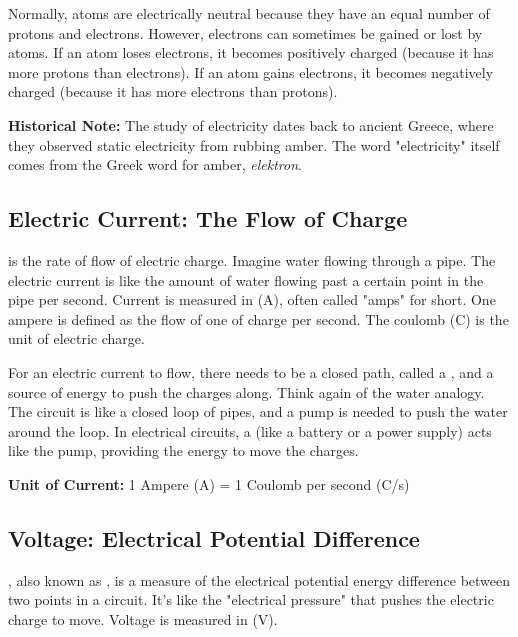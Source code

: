 Normally, atoms are electrically neutral because they have an equal number of protons and electrons. However, electrons can sometimes be gained or lost by atoms. If an atom loses electrons, it becomes positively charged (because it has more protons than electrons). If an atom gains electrons, it becomes negatively charged (because it has more electrons than protons).

\begin{marginnote}
\textbf{Historical Note:} The study of electricity dates back to ancient Greece, where they observed static electricity from rubbing amber.  The word "electricity" itself comes from the Greek word for amber, \textit{elektron}. 
\end{marginnote}

\subsection{Electric Current: The Flow of Charge}

 is the rate of flow of electric charge.  Imagine water flowing through a pipe.  The electric current is like the amount of water flowing past a certain point in the pipe per second.  Current is measured in  (A), often called "amps" for short.  One ampere is defined as the flow of one  of charge per second.  The coulomb (C) is the unit of electric charge.

For an electric current to flow, there needs to be a closed path, called a , and a source of energy to push the charges along.  Think again of the water analogy.  The circuit is like a closed loop of pipes, and a pump is needed to push the water around the loop. In electrical circuits, a  (like a battery or a power supply) acts like the pump, providing the energy to move the charges.

\begin{marginnote}
\textbf{Unit of Current:}
1 Ampere (A) = 1 Coulomb per second (C/s)
\end{marginnote}

\subsection{Voltage: Electrical Potential Difference}

, also known as , is a measure of the electrical potential energy difference between two points in a circuit.  It's like the "electrical pressure" that pushes the electric charge to move.  Voltage is measured in  (V).

